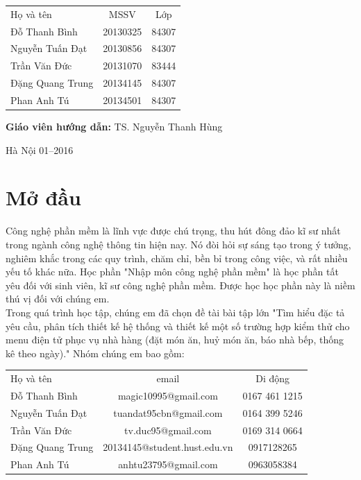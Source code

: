 \documentclass[a4paper,12pt]{report}
\begin{document}
\begin{longtable}{l c c}

Họ và tên & MSSV  & Lớp\\
Đỗ Thanh Bình & 20130325 & 84307 \\
Nguyễn Tuấn Đạt &  20130856 & 84307 \\
Trần Văn  Đức & 20131070 & 83444 \\
Đặng Quang Trung & 20134145  & 84307 \\
Phan Anh Tú & 20134501  & 84307 \\

\end{longtable}

\hspace{1cm}\fontsize{14}{16}\selectfont \textbf{Giáo viên hướng dẫn: }TS. Nguyễn Thanh Hùng\\[2cm]
\begin{center}
\fontsize{16}{19}\selectfont Hà Nội 01--2016

\end{center}
\newpage

\tableofcontents
\listoffigures
\listoftables


\chapter*{Mở đầu}
Công nghệ phần mềm là lĩnh vực được chú trọng, thu hút đông đảo kĩ sư nhất trong ngành công nghệ thông tin hiện nay. Nó đòi hỏi sự sáng tạo trong ý tưởng, nghiêm khắc trong các quy trình, chăm chỉ, bền bỉ trong công việc, và rất nhiều yếu tố khác nữa. Học phần "Nhập môn công nghệ phần mềm" là học phần tất yêu đối với sinh viên, kĩ sư công nghệ phần mềm. Được học học phần này là niềm thú vị đối với chúng em.\\

Trong quá trình học tập, chúng em đã chọn đề tài bài tập lớn "Tìm	 hiểu đặc	tả yêu	cầu,	phân	tích	thiết	kế hệ thống	và	thiết	kế một	số
trường	hợp	kiểm	 thử cho menu	điện	 tử phục	 vụ nhà	hàng (đặt món ăn,	huỷ món	
ăn,	báo	nhà	bếp,	thống kê theo ngày)." Nhóm chúng em bao gồm:\\
\begin{longtable}{l c c}

Họ và tên & email  & Di động\\
Đỗ Thanh Bình & magic10995@gmail.com & 0167 461 1215 \\
Nguyễn Tuấn Đạt &  tuandat95cbn@gmail.com & 0164 399 5246 \\
Trần Văn  Đức & tv.duc95@gmail.com & 0169 314 0664 \\
Đặng Quang Trung & 20134145@student.hust.edu.vn  & 0917128265 \\
Phan Anh Tú & anhtu23795@gmail.com  & 0963058384 \\
\end{longtable}
\end{document}
